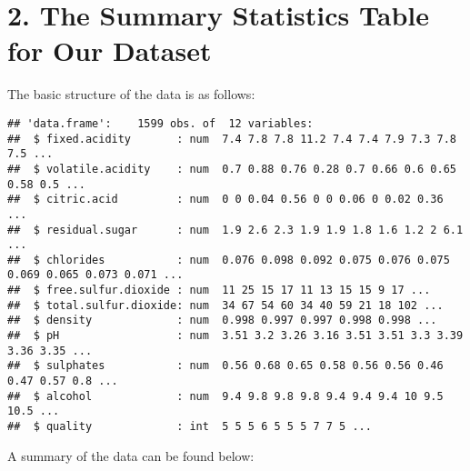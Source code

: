 \documentclass[]{article}
\begin{document}
\clearpage

\hypertarget{the-summary-statistics-table-for-our-dataset}{%
\section{2. The Summary Statistics Table for Our
Dataset}\label{the-summary-statistics-table-for-our-dataset}}

The basic structure of the data is as follows:

\begin{verbatim}
## 'data.frame':    1599 obs. of  12 variables:
##  $ fixed.acidity       : num  7.4 7.8 7.8 11.2 7.4 7.4 7.9 7.3 7.8 7.5 ...
##  $ volatile.acidity    : num  0.7 0.88 0.76 0.28 0.7 0.66 0.6 0.65 0.58 0.5 ...
##  $ citric.acid         : num  0 0 0.04 0.56 0 0 0.06 0 0.02 0.36 ...
##  $ residual.sugar      : num  1.9 2.6 2.3 1.9 1.9 1.8 1.6 1.2 2 6.1 ...
##  $ chlorides           : num  0.076 0.098 0.092 0.075 0.076 0.075 0.069 0.065 0.073 0.071 ...
##  $ free.sulfur.dioxide : num  11 25 15 17 11 13 15 15 9 17 ...
##  $ total.sulfur.dioxide: num  34 67 54 60 34 40 59 21 18 102 ...
##  $ density             : num  0.998 0.997 0.997 0.998 0.998 ...
##  $ pH                  : num  3.51 3.2 3.26 3.16 3.51 3.51 3.3 3.39 3.36 3.35 ...
##  $ sulphates           : num  0.56 0.68 0.65 0.58 0.56 0.56 0.46 0.47 0.57 0.8 ...
##  $ alcohol             : num  9.4 9.8 9.8 9.8 9.4 9.4 9.4 10 9.5 10.5 ...
##  $ quality             : int  5 5 5 6 5 5 5 7 7 5 ...
\end{verbatim}

A summary of the data can be found below:
\end{document}
